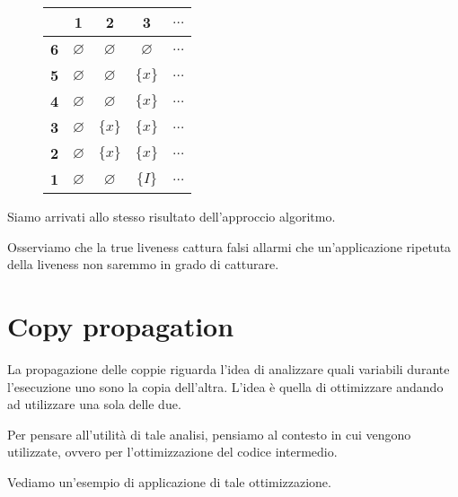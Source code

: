\begin{figure}[H]
    \centering
    \begin{tabular}{|c|c|c|c|c|}
        \hline
        & \textbf{1} & \textbf{2} & \textbf{3} & \textbf{$\dots$} \\
        \hline
        \textbf{6} &$\varnothing$ & $\varnothing$ & $\varnothing$ & $\dots$ \\
        \hline
        \textbf{5} & $\varnothing$ & $\varnothing$ & $\{x\}$ & $\dots$ \\
        \hline
        \textbf{4} & $\varnothing$ &$\varnothing$ & $\{x\}$ & $\dots$ \\
        \hline
        \textbf{3} & $\varnothing$ & $\{x\}$ & $\{x\}$  & $\dots$ \\
        \hline
        \textbf{2} & $\varnothing$  & $\{x\}$ & $\{x\}$ & $\dots$ \\
        \hline
        \textbf{1} & $\varnothing$  & $\varnothing$ & $\{I\}$ & $\dots$ \\
        \hline
    \end{tabular}
\end{figure}
Siamo arrivati allo stesso risultato dell'approccio algoritmo.

Osserviamo che la true liveness cattura falsi allarmi che un'applicazione ripetuta 
della liveness non saremmo in grado di catturare.

\section{Copy propagation}
La propagazione delle coppie riguarda l'idea di analizzare quali variabili durante l'esecuzione 
uno sono la copia dell'altra. L'idea è quella di ottimizzare andando ad utilizzare una sola delle due.

Per pensare all'utilità di tale analisi, pensiamo al contesto in cui vengono utilizzate, ovvero 
per l'ottimizzazione del codice intermedio.

Vediamo un'esempio di applicazione di tale ottimizzazione.


